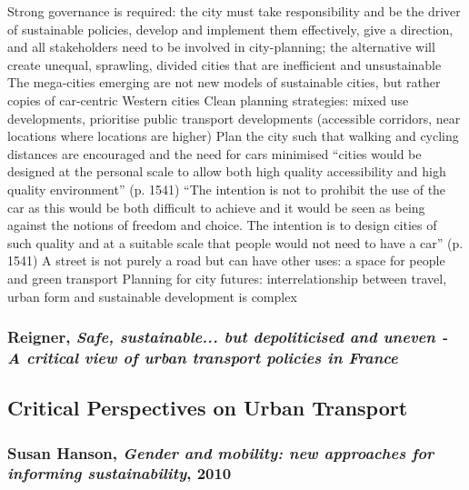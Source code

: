 \documentclass{article}
\begin{document}
\begin{outline}
		\2 Strong governance is required: the city must take responsibility and be the driver of sustainable policies, develop and implement them effectively, give a direction, and all stakeholders need to be involved in city-planning; the alternative will create unequal, sprawling, divided cities that are inefficient and unsustainable 
		\2 The mega-cities emerging are not new models of sustainable cities, but rather copies of car-centric Western cities
	\1 Clean planning strategies: mixed use developments, prioritise public transport developments (accessible corridors, near locations where locations are higher)
		\2 Plan the city such that walking and cycling distances are encouraged and the need for cars minimised
		\2 ``cities would be designed at the personal scale to allow both high quality accessibility and high quality environment'' (p. 1541)
		\2 ``The intention is not to prohibit the use of the car as this would be both difficult to achieve and it would be seen as being against the notions of freedom and choice. The intention is to design cities of such quality and at a suitable scale that people would not need to have a car'' (p. 1541)
	\1 A street is not purely a road but can have other uses: a space for people and green transport
	\1 Planning for city futures: interrelationship between travel, urban form and sustainable development is complex
\end{outline}

\subsubsection{Reigner, \textit{Safe, sustainable... but depoliticised and uneven - A critical view of urban transport policies in France}}

\begin{outline}
	\1
\end{outline}

\subsection{Critical Perspectives on Urban Transport}

\subsubsection{Susan Hanson, \textit{Gender and mobility: new approaches for informing sustainability}, 2010}
\end{document}
